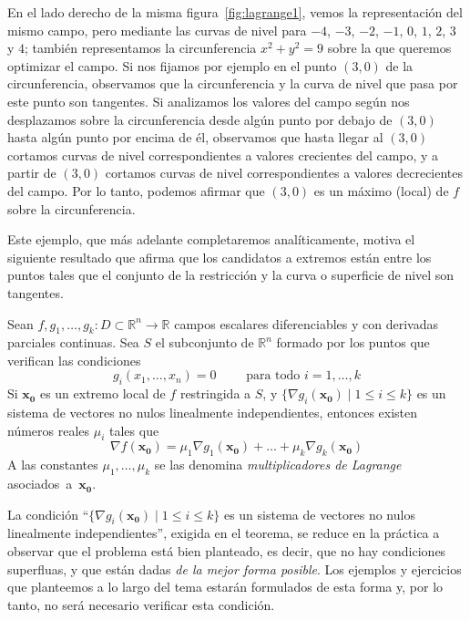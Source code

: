 En el lado derecho de la misma figura~\ref{fig:lagrange1}, vemos la representación del mismo campo, pero mediante las curvas de nivel para $-4$, $-3$, $-2$, $-1$, $0$, $1$, $2$, $3$ y $4$; también representamos la circunferencia $x^2+y^2=9$ sobre la que queremos optimizar el campo.
Si nos fijamos por ejemplo en el punto $(3,0)$ de la circunferencia, observamos que la circunferencia y la curva de nivel que pasa por este punto son tangentes.
Si analizamos los valores del campo según nos desplazamos sobre la circunferencia desde algún punto por debajo de $(3,0)$ hasta algún punto por encima de él, observamos que hasta llegar al $(3,0)$ cortamos curvas de nivel correspondientes a valores crecientes del campo, y a partir de $(3,0)$ cortamos curvas de nivel correspondientes a valores decrecientes del campo.
Por lo tanto, podemos afirmar que $(3,0)$ es un máximo (local) de $f$ sobre la circunferencia.

Este ejemplo, que más adelante completaremos analíticamente, motiva el siguiente resultado que afirma que los candidatos a extremos están entre los puntos tales que el conjunto de la restricción y la curva o superficie de nivel son tangentes.

\begin{teorema} Sean $f,g_1,\dots,g_k\colon \mathit{D}\subset \mathbb{R}^n\to\mathbb{R}$ campos escalares
diferenciables y con derivadas parciales continuas. Sea $S$ el subconjunto de $\mathbb{R}^n$ formado por los puntos que verifican las condiciones
\[
g_i(x_1,\dots,x_n)=0\qquad\text{ para todo } i=1,\dots,k
\]
Si $\boldsymbol{x_0}$ es un extremo
local de $f$ restringida a $S$, y $\{\nabla g_i(\boldsymbol{x_0})\mid 1\le i\le k\}$ es un sistema de vectores no nulos linealmente independientes, entonces existen números reales $\mu_i$ tales que 
\[
\nabla f(\boldsymbol{x_0})=\mu_1\nabla g_1(\boldsymbol{x_0})+\dots +\mu_k\nabla g_k(\boldsymbol{x_0})
\]
A las constantes $\mu_1,\dots,\mu_k$ se las denomina \emph{multiplicadores de Lagrange}
asociados~a~$\boldsymbol{x_0}$.
\end{teorema}
%
La condición
``$\{\nabla g_i(\boldsymbol{x_0})\mid 1\le i\le k\}$ es un sistema de vectores no nulos
linealmente independientes'', exigida en el teorema, se
reduce en la práctica a observar que el problema está bien planteado, es decir, que no hay condiciones superfluas, y que  están dadas \emph{de la mejor forma posible}.
Los ejemplos y ejercicios que planteemos a lo largo del tema estarán formulados de esta forma y, por lo tanto, no será necesario verificar esta condición.

